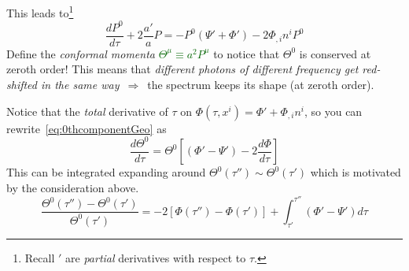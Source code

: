 This leads to\footnote{Recall $'$ are \emph{partial} derivatives with respect to $\tau$.}
\begin{equation}\label{eq:0thcomponentGeo}
    \frac{dP^0}{d \tau} + 2\frac{a'}{a}P = -P^0 \left(\Psi'+\Phi'\right) -2\Phi_{,i}n^i P^0
\end{equation}
Define the \textit{conformal momenta} \textcolor{darkgreen}{$\varTheta^\mu \equiv  a^2 P^\mu $} to notice that $\varTheta^0$ is conserved at zeroth order! This means that 
\emph{different photons of different frequency get red-shifted in the same way} $\,\Rightarrow\,$ the spectrum keeps its shape (at zeroth order).

Notice that the \emph{total} derivative of $\tau$ on $\Phi(\tau,x^i) = \Phi'+ \Phi_{,i}n^i$, so you can rewrite~\eqref{eq:0thcomponentGeo} as
\begin{equation}
    \frac{d\varTheta^0}{d \tau} = \varTheta^0 \left[\left(\Phi' - \Psi' \right) - 2  \frac{d\Phi}{d\tau}\right]
\end{equation}
This can be integrated expanding around $\varTheta^0(\tau'') \sim  \varTheta^0(\tau')$ which is motivated by the consideration above.
\begin{equation}\label{eq:momentaShifts}
    \frac{\Theta^{0}(\tau'')-\Theta^{0}(\tau')}{\Theta^{0}(\tau')} = - 2\left[\Phi(\tau'')-\Phi(\tau')\right] + \int_{\tau'}^{\tau''} \left(\Phi'-\Psi'\right)d\tau 
\end{equation}

